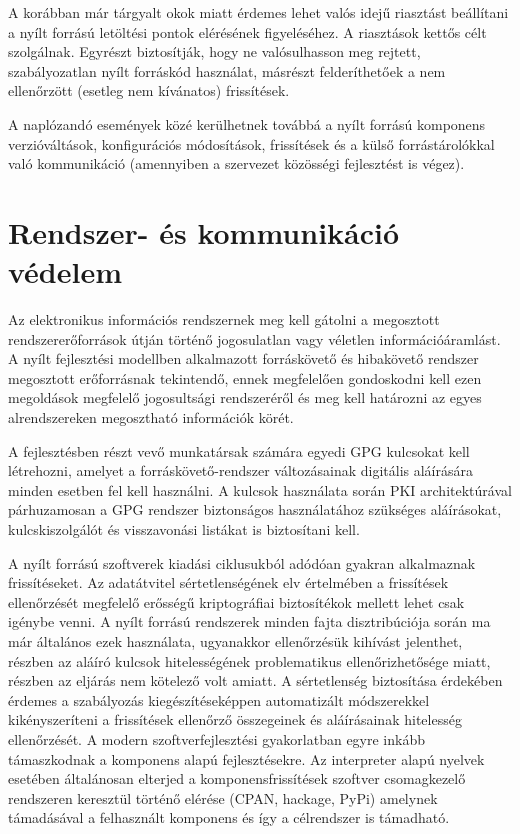 \documentclass[12pt,magyar,a4paper,oneside]{scrreprt}
\begin{document}
A korábban már tárgyalt okok miatt érdemes lehet valós idejű riasztást
beállítani a nyílt forrású letöltési pontok elérésének figyeléséhez. A
riasztások kettős célt szolgálnak. Egyrészt biztosítják, hogy ne
valósulhasson meg rejtett, szabályozatlan nyílt forráskód használat,
másrészt felderíthetőek a nem ellenőrzött (esetleg nem kívánatos)
frissítések.

A naplózandó események közé kerülhetnek továbbá a nyílt forrású
komponens verzióváltások, konfigurációs módosítások, frissítések és a
külső forrástárolókkal való kommunikáció (amennyiben a szervezet
közösségi fejlesztést is végez).

\hypertarget{rendszer--uxe9s-kommunikuxe1ciuxf3-vuxe9delem}{%
\section{Rendszer- és kommunikáció
védelem}\label{rendszer--uxe9s-kommunikuxe1ciuxf3-vuxe9delem}}

Az elektronikus információs rendszernek meg kell gátolni a megosztott
rendszererőforrások útján történő jogosulatlan vagy véletlen
információáramlást. A nyílt fejlesztési modellben alkalmazott
forráskövető és hibakövető rendszer megosztott erőforrásnak tekintendő,
ennek megfelelően gondoskodni kell ezen megoldások megfelelő
jogosultsági rendszeréről és meg kell határozni az egyes alrendszereken
megosztható információk körét.

A fejlesztésben részt vevő munkatársak számára egyedi GPG kulcsokat kell
létrehozni, amelyet a forráskövető-rendszer változásainak digitális
aláírására minden esetben fel kell használni. A kulcsok használata során
PKI architektúrával párhuzamosan a GPG rendszer biztonságos
használatához szükséges aláírásokat, kulcskiszolgálót és visszavonási
listákat is biztosítani kell.

A nyílt forrású szoftverek kiadási ciklusukból adódóan gyakran
alkalmaznak frissítéseket. Az adatátvitel sértetlenségének elv
értelmében a frissítések ellenőrzését megfelelő erősségű kriptográfiai
biztosítékok mellett lehet csak igénybe venni. A nyílt forrású
rendszerek minden fajta disztribúciója során ma már általános ezek
használata, ugyanakkor ellenőrzésük kihívást jelenthet, részben az
aláíró kulcsok hitelességének problematikus ellenőrizhetősége miatt,
részben az eljárás nem kötelező volt amiatt. A sértetlenség biztosítása
érdekében érdemes a szabályozás kiegészítéseképpen automatizált
módszerekkel kikényszeríteni a frissítések ellenőrző összegeinek és
aláírásainak hitelesség ellenőrzését. A modern szoftverfejlesztési
gyakorlatban egyre inkább támaszkodnak a komponens alapú fejlesztésekre.
Az interpreter alapú nyelvek esetében általánosan elterjed a
komponensfrissítések szoftver csomagkezelő rendszeren keresztül történő
elérése (CPAN, hackage, PyPi) amelynek támadásával a felhasznált
komponens és így a célrendszer is támadható.
\end{document}
